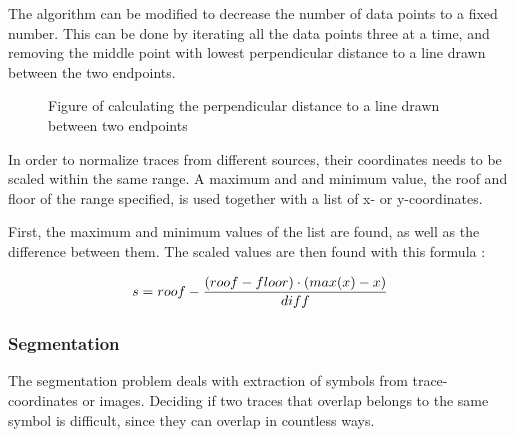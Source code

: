 The algorithm can be modified to decrease the number of data points to a fixed number. This can be done by iterating all the data points three at a time, and removing the middle point with lowest perpendicular distance to a line drawn between the two endpoints.

\begin{figure}[H]
    \centering
    \caption{Figure of calculating the perpendicular distance to a line drawn between two endpoints}
    \label{fig:my_label}
\end{figure}
\label{ramer_douglas_peucker}

In order to normalize traces from different sources, their coordinates needs to be scaled within the same range. A maximum and and minimum value, the roof and floor of the range specified, is used together with a list of x- or y-coordinates.

First, the maximum and minimum values of the list are found, as well as the difference between them. The scaled values are then found with this formula \cite{_normalize_????}:

\begin{equation} \label{eqn:scale_linear_by_column}
\centering
\begin{split}
    s = roof - \frac{(roof - floor) \cdot (max(x) - x)}{diff}
\end{split}
\end{equation}
\label{scale_linear_by_column}

\subsubsection{Segmentation} \label{Segmentation}

The segmentation problem deals with extraction of symbols from trace-coordinates or images. Deciding if two traces that overlap belongs to the same symbol is difficult, since they can overlap in countless ways. 

